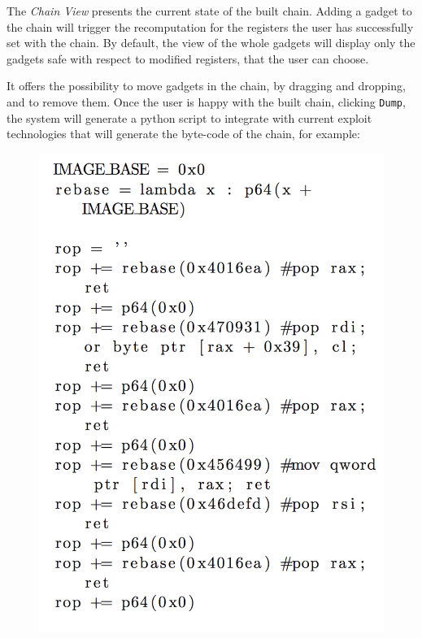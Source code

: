 \documentclass[twocolumn, 11pt]{article}
\begin{document}
The \textit{Chain View} presents the current state of the built chain. Adding a gadget to the chain will trigger the recomputation for the registers the user has successfully set with the chain. By default, the view of the whole gadgets will display only the gadgets safe with respect to modified registers, that the user can choose.

It offers the possibility to move gadgets in the chain, by dragging and dropping, and to remove them. Once the user is happy with the built chain, clicking {\tt Dump}, the system will generate a python script to integrate with current exploit technologies that will generate the byte-code of the chain, for example:

\begin{figure}[htb]
  \centering
  \includegraphics[width=0.9\linewidth]{dump}
\end{figure}
\end{document}

